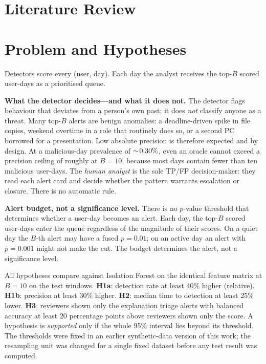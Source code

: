 \documentclass[conference]{IEEEtran}
\newcommand{\B}{\ensuremath{B}}
\begin{document}
\section{Literature Review}


\section{Problem and Hypotheses}
Detectors score every (user, day). Each day the analyst receives the top-\B{} scored user-days as a
prioritised queue.

\textbf{What the detector decides---and what it does not.}
The detector flags behaviour that deviates from a person's own past; it does \emph{not} classify
anyone as a threat. Many top-$B$ alerts are benign anomalies: a deadline-driven spike in file
copies, weekend overtime in a role that routinely does so, or a second PC borrowed for a
presentation. Low absolute precision is therefore expected and by design. At a malicious-day
prevalence of $\sim\!0.30\%$, even an oracle cannot exceed a precision ceiling of roughly
\OracleP{} at $B=10$, because most days contain fewer than ten malicious user-days. The
\emph{human analyst} is the sole TP/FP decision-maker: they read each alert card and decide
whether the pattern warrants escalation or closure. There is no automatic rule.

\textbf{Alert budget, not a significance level.}
There is no $p$-value threshold that determines whether a user-day becomes an alert. Each day,
the top-$B$ scored user-days enter the queue regardless of the magnitude of their scores. On a
quiet day the $B$-th alert may have a fused $p=0.01$; on an active day an alert with $p=0.001$
might not make the cut. The budget determines the alert, not a significance level.

All hypotheses compare against Isolation Forest on the identical feature matrix at $\B=10$ on the
test windows. \textbf{H1a}: detection rate at least 40\% higher (relative). \textbf{H1b}:
precision at least 30\% higher. \textbf{H2}: median time to detection at least 25\% lower.
\textbf{H3}: reviewers shown only the explanation triage alerts with balanced accuracy at least 20
percentage points above reviewers shown only the score. A hypothesis is \emph{supported} only if
the whole 95\% interval lies beyond its threshold. The thresholds were fixed in an earlier
synthetic-data version of this work; the resampling unit was changed for a single fixed dataset
before any test result was computed.
\end{document}
